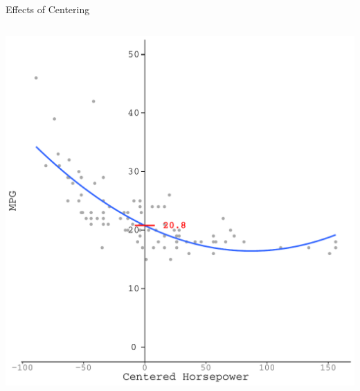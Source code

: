 \documentclass{beamer}\usepackage[]{graphicx}\usepackage[]{color}
\makeatletter
\def\maxwidth{ %
  \ifdim\Gin@nat@width>\linewidth
    \linewidth
  \else
    \Gin@nat@width
  \fi
}
\newenvironment{knitrout}{}{} %
\makeatother
\begin{document}
\begin{frame}{Effects of Centering}
\begin{columns}
\begin{column}{0.5\textwidth}
\begin{knitrout}
{\centering \includegraphics[width=\maxwidth]{figure/unnamed-chunk-34-1} 

}



\end{knitrout}

\end{column}
\end{columns}

\end{frame}

    
\end{document}
